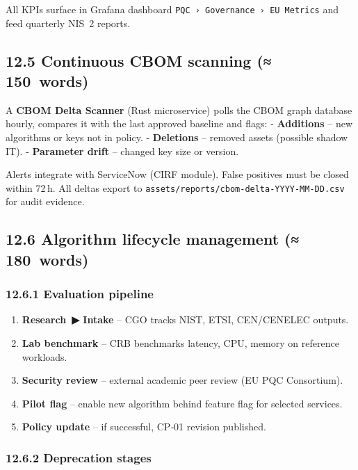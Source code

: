 \documentclass[
  english,
]{article}
\providecommand{\tightlist}{%
  \setlength{\itemsep}{0pt}\setlength{\parskip}{0pt}}
\begin{document}
All KPIs surface in Grafana dashboard
\texttt{PQC\ ›\ Governance\ ›\ EU\ Metrics} and feed quarterly NIS~2
reports.

\subsection{12.5 Continuous CBOM scanning
(≈\,150~words)}\label{continuous-cbom-scanning-150-words}

A \textbf{CBOM Delta Scanner} (Rust microservice) polls the CBOM graph
database hourly, compares it with the last approved baseline and flags:
- \textbf{Additions} -- new algorithms or keys not in policy. -
\textbf{Deletions} -- removed assets (possible shadow IT). -
\textbf{Parameter drift} -- changed key size or version.

Alerts integrate with ServiceNow (CIRF module). False positives must be
closed within 72\,h. All deltas export to
\texttt{assets/reports/cbom-delta-YYYY‑MM‑DD.csv} for audit evidence.

\subsection{12.6 Algorithm lifecycle management
(≈\,180~words)}\label{algorithm-lifecycle-management-180-words}

\subsubsection{12.6.1 Evaluation pipeline}\label{evaluation-pipeline}

\begin{enumerate}
\def\labelenumi{\arabic{enumi}.}
\tightlist
\item
  \textbf{Research~▶ Intake} -- CGO tracks NIST, ETSI, CEN/CENELEC
  outputs.
\item
  \textbf{Lab benchmark} -- CRB benchmarks latency, CPU, memory on
  reference workloads.
\item
  \textbf{Security review} -- external academic peer review (EU PQC
  Consortium).
\item
  \textbf{Pilot flag} -- enable new algorithm behind feature flag for
  selected services.
\item
  \textbf{Policy update} -- if successful, CP‑01 revision published.
\end{enumerate}

\subsubsection{12.6.2 Deprecation stages}\label{deprecation-stages}
\end{document}

